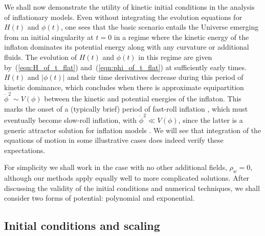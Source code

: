 We shall now demonstrate the utility of kinetic initial conditions in the analysis of inflationary models. Even without integrating the evolution equations for $H(t)$ and $\phi(t)$, one sees that the basic scenario entails the Universe emerging from an initial singularity at $t=0$ in a regime where the kinetic energy of the inflaton dominates its potential energy along with any curvature or additional fluids.  The evolution of $H(t)$ and $\phi(t)$ in this regime are given by~(\ref{eqn:H_of_t_flat}) and~(\ref{eqn:phi_of_t_flat}) at sufficiently early times.  $H(t)$ and $|\phi(t)|$ and their time derivatives decrease during this period of kinetic dominance, which concludes when there is approximate equipartition $\dot{\phi}^2 \sim V(\phi)$ between the kinetic and potential energies of the inflaton.  This marks the onset of a (typically brief) period of fast-roll inflation \citep{Linde:2001}, which must eventually become slow-roll inflation, with $\dot{\phi}^2 \ll V(\phi)$, since the latter is a generic attractor solution for inflation models \citep{belinsky_inflationary_1985}.  We will see that integration of the equations of motion in some illustrative cases does indeed verify these expectations.

For simplicity we shall work in the case with no other additional fields, $\rho_w=0$, although our methods apply equally well to more complicated solutions. After discussing the validity of the initial conditions and numerical techniques, we shall consider two forms of potential: polynomial and exponential.

\subsection{Initial conditions and scaling}

